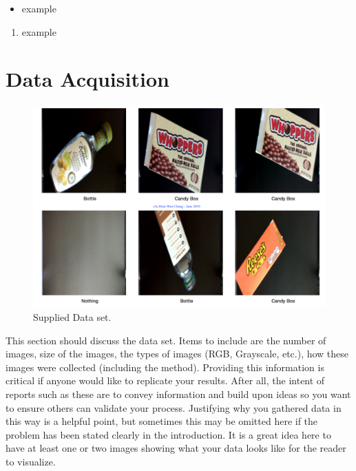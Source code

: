 \documentclass[10pt,journal,compsoc]{IEEEtran}
\begin{document}

\begin{itemize}
\item example
\end {itemize}



\begin{enumerate}
\item example

\end{enumerate}

\section{Data Acquisition}
\begin{figure}[thpb]
      \centering
      \includegraphics[width=\linewidth]{suplieDataset.png}
      \caption{Supplied Data set.}
      \label{fig:robot1}
\end{figure}
This section should discuss the data set. Items to include are the number of images, size of the images, the types of images (RGB, Grayscale, etc.), how these images were collected (including the method). Providing this information is critical if anyone would like to replicate your results. After all, the intent of reports such as these are to convey information and build upon ideas so you want to ensure others can validate your process.
Justifying why you gathered data in this way is a helpful point, but sometimes this may be omitted here if the problem has been stated clearly in the introduction.
It is a great idea here to have at least one or two images showing what your data looks like for the reader to visualize.
\end{document}
